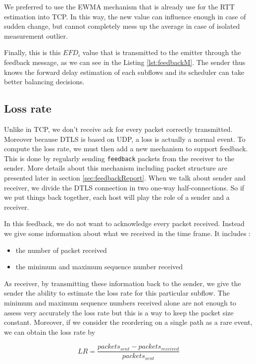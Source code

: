 We preferred to use the EWMA mechanism that is already use for the RTT estimation into TCP. In this way, the new value can influence enough in case of sudden change, but cannot completely mess up the average in case of isolated measurement outlier.

Finally, this is this $EFD_{i}$ value that is transmitted to the emitter through the feedback message, as we can see in the Listing \ref{lst:feedbackM}. The sender thus knows the forward delay estimation of each subflows and its scheduler can take better balancing decisions.

\subsection{Loss rate}
\label{sec:design-loss-rate}

Unlike in TCP, we don't receive ack for every packet correctly transmitted. Moreover because DTLS is based on UDP, a loss is actually a normal event. To compute the loss rate, we must then add a new mechanism to support feedback. This is done by regularly sending \texttt{feedback} packets from the receiver to the sender. More details about this mechanism including packet structure are presented later in section \ref{sec:feedbackReport}. When we talk about sender and receiver, we divide the DTLS connection in two one-way half-connections. So if we put things back together, each host will play the role of a sender and a receiver.

In this feedback, we do not want to acknowledge every packet received. Instead we give some information about what we received in the time frame. It includes : 

\begin{itemize}
\item the number of packet received
\item the minimum and maximum sequence number received
\end{itemize}

As receiver, by transmitting these information back to the sender, we give the sender the ability to estimate the loss rate for this particular subflow. The minimum and maximum sequence numbers received alone are not enough to assess very accurately the loss rate but this is a way to keep the packet size constant. Moreover, if we consider the reordering on a single path as a rare event, we can obtain the loss rate by 

\begin{equation*}
LR = \frac{packets_{sent} - packets_{received}}{packets_{sent}}
\end{equation*}

